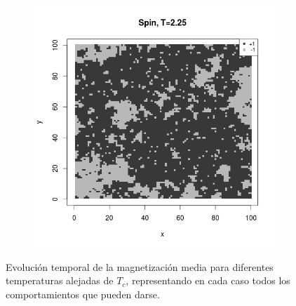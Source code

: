 \documentclass{scrartcl}
\begin{document}
\begin{figure}[ht]
\begin{subfigure}{.35\textwidth}
\end{subfigure}%
\begin{subfigure}{.35\textwidth}
  \centering
  \includegraphics[width=1\linewidth]{spins/spinT2_25}
\end{subfigure}
\caption{Evolución temporal de la magnetización media para diferentes temperaturas alejadas de $T_c$, representando en cada caso todos los comportamientos que pueden darse.}
\label{fig:spinsmenorTc}
\end{figure}
\end{document}
